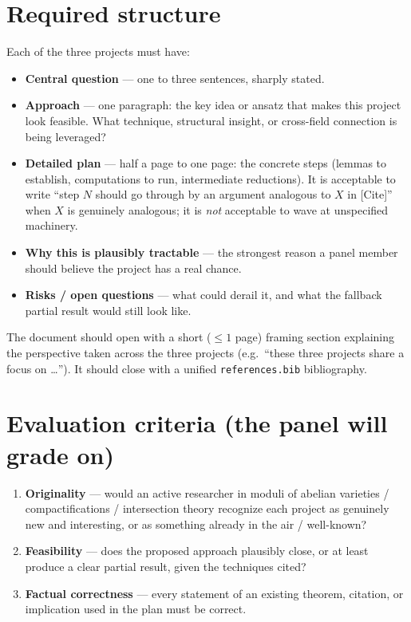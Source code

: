 \section*{Required structure}

Each of the three projects must have:

\begin{itemize}
\item \textbf{Central question} --- one to three sentences, sharply
  stated.
\item \textbf{Approach} --- one paragraph: the key idea or ansatz that
  makes this project look feasible. What technique, structural insight,
  or cross-field connection is being leveraged?
\item \textbf{Detailed plan} --- half a page to one page: the concrete
  steps (lemmas to establish, computations to run, intermediate
  reductions). It is acceptable to write ``step $N$ should go through
  by an argument analogous to $X$ in [Cite]'' when $X$ is genuinely
  analogous; it is \emph{not} acceptable to wave at unspecified
  machinery.
\item \textbf{Why this is plausibly tractable} --- the strongest reason
  a panel member should believe the project has a real chance.
\item \textbf{Risks / open questions} --- what could derail it, and
  what the fallback partial result would still look like.
\end{itemize}

The document should open with a short ($\le 1$ page) framing section
explaining the perspective taken across the three projects (e.g.\ ``these
three projects share a focus on \dots''). It should close with a unified
\texttt{references.bib} bibliography.

\section*{Evaluation criteria (the panel will grade on)}

\begin{enumerate}
\item \textbf{Originality} --- would an active researcher in moduli of
  abelian varieties / compactifications / intersection theory
  recognize each project as genuinely new and interesting, or as
  something already in the air / well-known?

\item \textbf{Feasibility} --- does the proposed approach plausibly
  close, or at least produce a clear partial result, given the
  techniques cited?

\item \textbf{Factual correctness} --- every statement of an existing
  theorem, citation, or implication used in the plan must be correct.
\end{enumerate}

